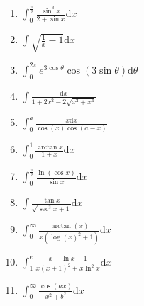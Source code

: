 \documentclass[11pt, a4paper]{article}
\newcommand{\dd}{\mathrm{d}}
\begin{document}
\begin{enumerate}
    \item $\int_0^{\frac{\pi}{2}} \frac{\sin^3{x}}{2+\sin{x}} \dd x$ 
    \item $\int \sqrt{\frac{1}{x}-1} \dd x$ 
    \item $\int_0^{2\pi} e^{3\cos{\theta}}\cos(3\sin{\theta}) \dd \theta $ 
    \item $\int \frac{\dd x}{1+2x^2-2\sqrt{x^2+x^4}}$ 
    \item $\int_0^a \frac{x \dd x}{\cos(x)\cos(a-x)}$ 
    \item $\int_0^1 \frac{\arctan{x}}{1+x} \dd x$ 
    \item $\int_0^{\frac{\pi}{2}} \frac{\ln(\cos{x})}{\sin{x}} \dd x$ 
    \item $\int \frac{\tan{x}}{\sqrt{\sec^3{x}+1}} \dd x$ 
    \item $\int_0^{\infty} \frac{\arctan(x)}{x(\log(x)^2+1)} \dd x$ 
    \item $\int_1^e \frac{x-\ln{x}+1}{x(x+1)^2+x\ln^2{x}} \dd x$ 
    \item $\int_0^{\infty} \frac{\cos(ax)}{x^2+b^2} \dd x$  

\end{enumerate}
\end{document}
